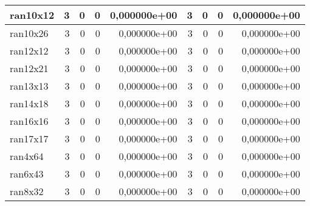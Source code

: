 \begin{tabular}{|l|r|r|r|r|r|r|r|r|}
ran10x12 & 3 & 0 & 0 & 0,000000e+00 & 3 & 0 & 0 & 0,000000e+00 \\ \hline
ran10x26 & 3 & 0 & 0 & 0,000000e+00 & 3 & 0 & 0 & 0,000000e+00 \\ \hline
ran12x12 & 3 & 0 & 0 & 0,000000e+00 & 3 & 0 & 0 & 0,000000e+00 \\ \hline
ran12x21 & 3 & 0 & 0 & 0,000000e+00 & 3 & 0 & 0 & 0,000000e+00 \\ \hline
ran13x13 & 3 & 0 & 0 & 0,000000e+00 & 3 & 0 & 0 & 0,000000e+00 \\ \hline
ran14x18 & 3 & 0 & 0 & 0,000000e+00 & 3 & 0 & 0 & 0,000000e+00 \\ \hline
ran16x16 & 3 & 0 & 0 & 0,000000e+00 & 3 & 0 & 0 & 0,000000e+00 \\ \hline
ran17x17 & 3 & 0 & 0 & 0,000000e+00 & 3 & 0 & 0 & 0,000000e+00 \\ \hline
ran4x64 & 3 & 0 & 0 & 0,000000e+00 & 3 & 0 & 0 & 0,000000e+00 \\ \hline
ran6x43 & 3 & 0 & 0 & 0,000000e+00 & 3 & 0 & 0 & 0,000000e+00 \\ \hline
ran8x32 & 3 & 0 & 0 & 0,000000e+00 & 3 & 0 & 0 & 0,000000e+00 \\ \hline
\end{tabular}

